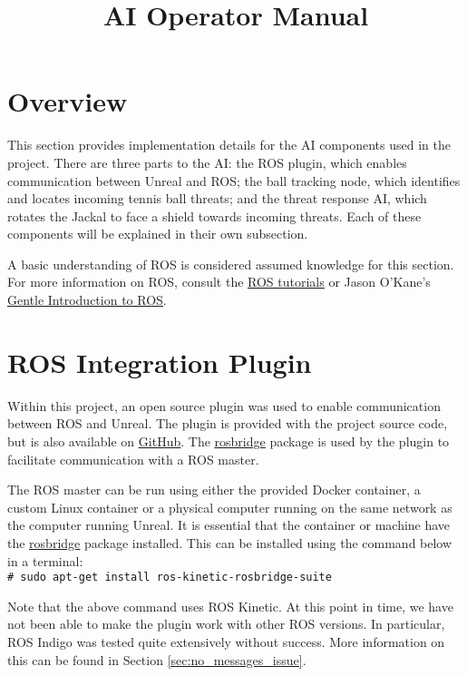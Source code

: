 \documentclass[../main.tex]{subfiles}
\title{AI Operator Manual}
\begin{document}
\newcommand{\shellcmd}[1]{\\\indent\indent\texttt{\footnotesize\# #1}}

\section{Overview}
This section provides implementation details for the AI components used in the project. There are three parts to the AI: the ROS plugin, which enables communication between Unreal and ROS; the ball tracking node, which identifies and locates incoming tennis ball threats; and the threat response AI, which rotates the Jackal to face a shield towards incoming threats. Each of these components will be explained in their own subsection. 

A basic understanding of ROS is considered assumed knowledge for this section. For more information on ROS, consult the \href{http://wiki.ros.org/ROS/Tutorials}{\underline{ROS tutorials}} or Jason O'Kane's \href{http://lsi.vc.ehu.es/pablogn/investig/ROS/A\%20Gentle\%20Introduction\%20to\%20ROS.pdf}{\underline{Gentle Introduction to ROS}}.

\section{ROS Integration Plugin}
Within this project, an open source plugin was used to enable communication between ROS and Unreal. The plugin is provided with the project source code, but is also available on \href{https://github.com/code-iai/ROSIntegration}{\underline{GitHub}}. The \href{http://wiki.ros.org/rosbridge_suite}{\underline{rosbridge}} package is used by the plugin to facilitate communication with a ROS master.

The ROS master can be run using either the provided Docker container, a custom Linux container or a physical computer running on the same network as the computer running Unreal. It is essential that the container or machine have the  \href{http://wiki.ros.org/rosbridge_suite}{\underline{rosbridge}} package installed. This can be installed using the command below in a terminal:
\shellcmd{sudo apt-get install ros-kinetic-rosbridge-suite}

Note that the above command uses ROS Kinetic. At this point in time, we have not been able to make the plugin work with other ROS versions. In particular, ROS Indigo was tested quite extensively without success. More information on this can be found in Section \ref{sec:no_messages_issue}.
\end{document}
